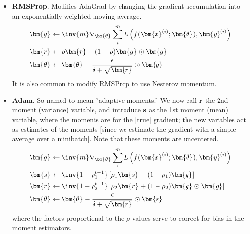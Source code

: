 \documentclass[11pt]{article}
\renewcommand\vec[2][]{\bm{#2}_{#1}}
\begin{document}
\begin{itemize}
	\item \textbf{RMSProp}. Modifies AdaGrad by changing the gradient accumulation into an exponentially weighted moving average.
	\begin{align}
		\vec g &\leftarrow \inv{m} \nabla_{\vec \theta} \sum_i^m L\left(  f(\vec{x}^{(i)}; \vec \theta), \vec{y}^{(i)}   \right) \\
		\vec{r} &\leftarrow \rho \vec{r} + (1 - \rho) \vec{g} \odot \vec{g} \\
		\vec{\theta} &\leftarrow \vec \theta - \frac{\epsilon}{\delta + \sqrt{\vec{r}}}  \odot\vec g
	\end{align}
	It is also common to modify RMSProp to use Nesterov momentum. 
	
	\item \textbf{Adam}. So-named to mean ``adaptive moments.'' We now call $\vec{r}$ the 2nd moment (variance) variable, and introduce $\vec{s}$ as the 1st moment (mean) variable, where the moments are for the [true] gradient; the new variables act as estimates of the moments [since we estimate the gradient with a simple average over a minibatch]. Note that these moments are uncentered. 
	\begin{align}
		\vec g &\leftarrow \inv{m} \nabla_{\vec \theta} \sum_i^m L\left(  f(\vec{x}^{(i)}; \vec \theta), \vec{y}^{(i)}   \right) \\
		\vec{s} &\leftarrow \inv{1 - \rho_1^{t-1}} \left[  \rho_1 \vec{s} + (1 - \rho_1) \vec{g} \right] \\
		\vec{r} &\leftarrow  \inv{1 - \rho_2^{t-1}} \left[  \rho_2 \vec{r} + (1 - \rho_2) \vec{g} \odot \vec{g} \right] \\
		\vec{\theta} &\leftarrow \vec \theta - \frac{\epsilon}{\delta + \sqrt{\vec{r}}} \odot \vec{s}
	\end{align}
	where the factors proportional to the $\rho$ values serve to correct for bias in the moment estimators.
\end{itemize}




\end{document}
